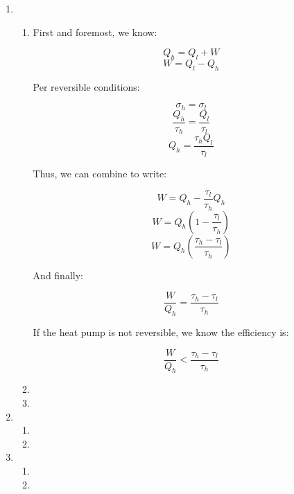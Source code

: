 \begin{enumerate}

  \item

    \begin{enumerate}

      \item 

        First and foremost, we know:

        $$Q_h=Q_l+W$$
        $$W=Q_l-Q_h$$

        Per reversible conditions:

        $$\sigma_h=\sigma_l$$
        $$\frac{Q_h}{\tau_h}=\frac{Q_l}{\tau_l}$$
        $$Q_h=\frac{\tau_hQ_l}{\tau_l}$$

        Thus, we can combine to write:

        $$W=Q_h-\frac{\tau_l}{\tau_h}Q_h$$
        $$W=Q_h\left( 1-\frac{\tau_l}{\tau_h}\right)$$
        $$W=Q_h\left( \frac{\tau_h-\tau_l}{\tau_h}\right)$$

        And finally:

        $$\boxed{\frac{W}{Q_h}=\frac{\tau_h-\tau_l}{\tau_h}}$$

        If the heat pump is not reversible, we know the efficiency is:

        $$\frac{W}{Q_h}<\frac{\tau_h-\tau_l}{\tau_h}$$

      \item 

      \item 

    \end{enumerate}

  \item

    \begin{enumerate}

      \item 

      \item 

    \end{enumerate}

  \item

    \begin{enumerate}

      \item 
        
      \item 
        

\end{enumerate}
\end{enumerate}
